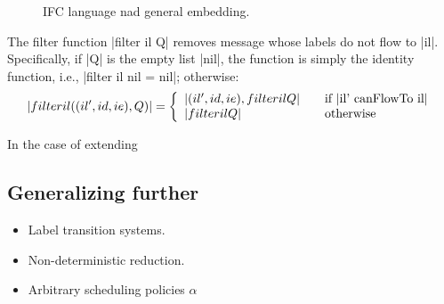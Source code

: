 \begin{figure}
\caption{IFC language nad general embedding.}
\label{fig:ml}
\end{figure}

The filter function |filter il Q| removes message whose labels do not
flow to |il|. Specifically, if |Q| is the empty list |nil|, the
function is simply the identity function, i.e.,
|filter il nil = nil|; otherwise:
\[
|filter il ((il', id, ie) , Q )| = \left\{
\begin{array}{l l}
|(il', id, ie) , filter il Q| & \quad \text{if |il' canFlowTo il|}\\
|filter il Q| & \quad \text{otherwise}
\end{array} \right.
\]


In the case of extending



\subsection{Generalizing further}

\begin{itemize}
\item Label transition systems.
\item Non-deterministic reduction.
\item Arbitrary scheduling policies $\alpha$
\end{itemize}




